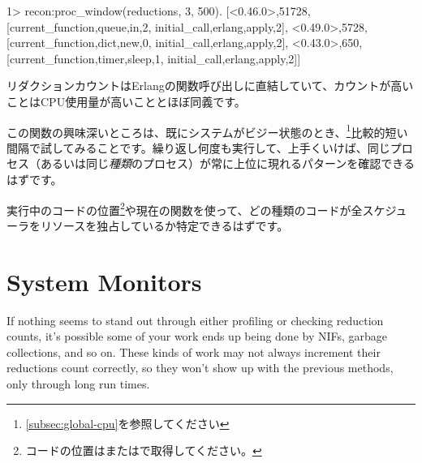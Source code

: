 \begin{VerbatimEshell}
1> recon:proc_window(reductions, 3, 500).
[{<0.46.0>,51728,
  [{current_function,{queue,in,2}},
   {initial_call,{erlang,apply,2}}]},
 {<0.49.0>,5728,
  [{current_function,{dict,new,0}},
   {initial_call,{erlang,apply,2}}]},
 {<0.43.0>,650,
  [{current_function,{timer,sleep,1}},
   {initial_call,{erlang,apply,2}}]}]
\end{VerbatimEshell}

リダクションカウントはErlangの関数呼び出しに直結していて、カウントが高いことはCPU使用量が高いこととほぼ同義です。

この関数の興味深いところは、既にシステムがビジー状態のとき、\footnote{\ref{subsec:global-cpu}を参照してください}比較的短い間隔で試してみることです。繰り返し何度も実行して、上手くいけば、同じプロセス（あるいは同じ\emph{種類}のプロセス）が常に上位に現れるパターンを確認できるはずです。

実行中のコードの位置\footnote{コードの位置はまたはで取得してください。}や現在の関数を使って、どの種類のコードが全スケジューラをリソースを独占しているか特定できるはずです。

\section{System Monitors}
\label{sec:cpu-system-monitors}

If nothing seems to stand out through either profiling or checking reduction counts, it's possible some of your work ends up being done by NIFs, garbage collections, and so on. These kinds of work may not always increment their reductions count correctly, so they won't show up with the previous methods, only through long run times.

